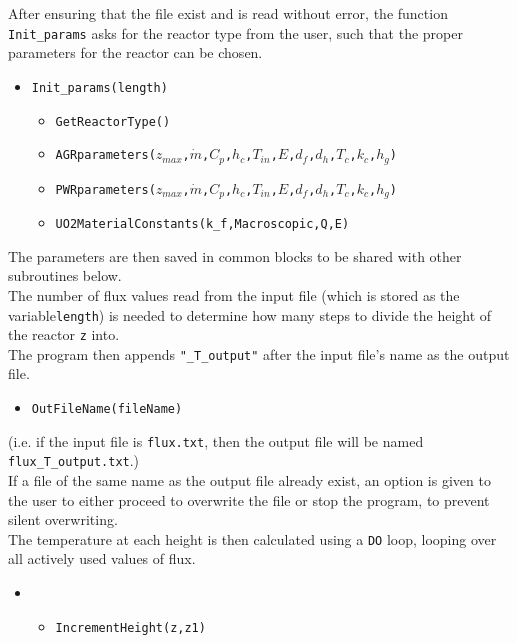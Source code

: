 \documentclass[a4paper, 12pt]{article}
\begin{document}
After ensuring that the file exist and is read without error, the function \texttt{Init\_params} asks for the reactor type from the user, such that the proper parameters for the reactor can be chosen.
\begin{itemize}
	\item \texttt{\textcolor{func}{Init\_params}(length)} 
	\begin{itemize}
		\item \texttt{\textcolor{func}{GetReactorType}()} 
		\item \texttt{\textcolor{subr}{AGRparameters}($z_{max}$,$\dot{m}$,$C_p$,$h_c$,$T_{in}$,$E$,$d_f$,$d_h$,$T_c$,$k_c$,$h_g$)}
		\item \texttt{\textcolor{subr}{PWRparameters}($z_{max}$,$\dot{m}$,$C_p$,$h_c$,$T_{in}$,$E$,$d_f$,$d_h$,$T_c$,$k_c$,$h_g$)}
		\item \texttt{\textcolor{subr}{UO2MaterialConstants}(k\_f,Macroscopic,Q,E)}
	\end{itemize}
\end{itemize}
The parameters are then saved in common blocks to be shared with other subroutines below.\\
The number of flux values read from the input file (which is stored as the variable\texttt{length}) is needed to determine how many steps to divide the height of the reactor \texttt{z} into.\\


The program then appends \texttt{"\_T\_output"} after the input file's name as the output file.
\begin{itemize}
	\item \texttt{\textcolor{func}{OutFileName}(fileName)} 
\end{itemize}
(i.e. if the input file is \texttt{flux.txt}, then the output file will be named \texttt{flux\_T\_output.txt}.) \\
If a file of the same name as the output file already exist, an option is given to the user to either proceed to overwrite the file or stop the program, to prevent silent overwriting.\\

The temperature at each height is then calculated using a \texttt{DO} loop, looping over all actively used values of flux.
\begin{itemize}
	\item[]
	\begin{itemize}
	\item \texttt{\textcolor{subr}{IncrementHeight}(z,z1)}
	\end  {itemize}
\end  {itemize}
\end{document}

